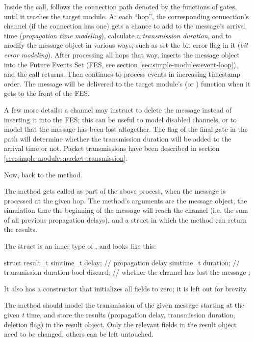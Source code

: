 Inside the  call, {\opp} follows the
connection path denoted by the  functions of gates,
until it reaches the target module. At each ``hop'', the corresponding
connection's channel (if the connection has one) gets a chance to add to
the message's arrival time (\textit{propagation time modeling}), calculate a
\textit{transmission duration}, and to modify the message object in various
ways, such as set the bit error flag in it (\textit{bit error modeling}).
After processing all hops that way, {\opp} inserts the message object
into the Future Events Set (FES, see section
\ref{sec:simple-modules:event-loop}), and the  call returns.
Then {\opp} continues to process events in increasing timestamp order.
The message will be delivered to the target module's 
(or ) function when it gets to the front of the FES.

A few more details: a channel may instruct {\opp} to delete the message
instead of inserting it into the FES; this can be useful to model
disabled channels, or to model that the message has been lost altogether.
The  flag of the final gate in the path
will determine whether the transmission duration will be added to the
arrival time or not. Packet transmissions have been described in section
\ref{sec:simple-modules:packet-transmission}.

Now, back to the  method.

The method gets called as part of the above process, when the message
is processed at the given hop. The method's arguments are the message
object, the simulation time the beginning of the message will reach
the channel (i.e. the sum of all previous propagation delays),
and a struct in which the method can return the results.

The  struct is an inner type of ,
and looks like this:

\begin{cpp}
struct result_t {
    simtime_t delay;     // propagation delay
    simtime_t duration;  // transmission duration
    bool discard;        // whether the channel has lost the message
};
\end{cpp}

It also has a constructor that initializes all fields to zero; it is left
out for brevity.

The method should model the transmission of the given message starting at
the given \textit{t} time, and store the results (propagation delay,
transmission duration, deletion flag) in the result object. Only the
relevant fields in the result object need to be changed, others can be left
untouched.

